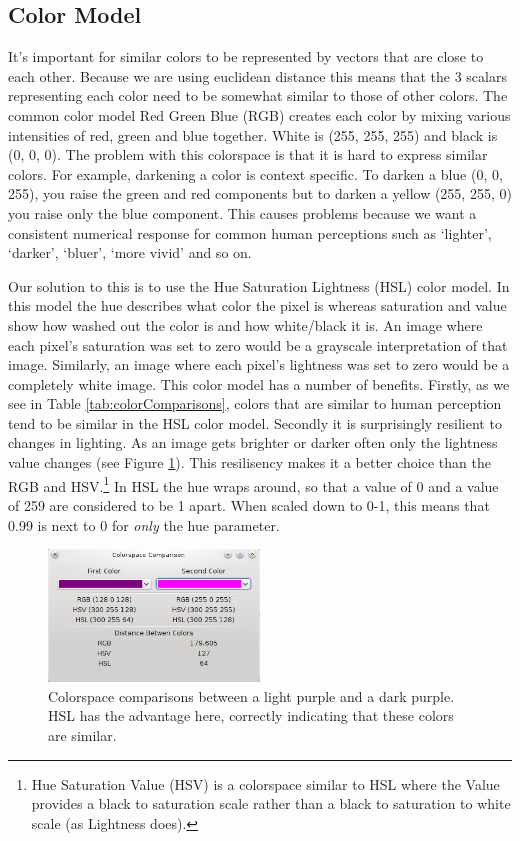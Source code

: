 \documentclass{article}
\renewcommand{\|}{\origbar} %
\begin{document}
\subsection{Color Model}
\label{sec:colorModel}

It's important for similar colors to be represented by vectors that are close to each other. Because we are using euclidean distance this means that the 3 scalars representing each color need to be somewhat similar to those of other colors. The common color model Red Green Blue (RGB) creates each color by mixing various intensities of red, green and blue together. White is (255, 255, 255) and black is (0, 0, 0). The problem with this colorspace is that it is hard to express similar colors. For example, darkening a color is context specific. To darken a blue (0, 0, 255), you raise the green and red components but to darken a yellow (255, 255, 0) you raise only the blue component. This causes problems because we want a consistent numerical response for common human perceptions such as `lighter', `darker', `bluer', `more vivid' and so on.

Our solution to this is to use the Hue Saturation Lightness (HSL) color model. In this model the hue describes what color the pixel is whereas saturation and value show how washed out the color is and how white/black it is. An image where each pixel's saturation was set to zero would be a grayscale interpretation of that image. Similarly, an image where each pixel's lightness was set to zero would be a completely white image. This color model has a number of benefits. Firstly, as we see in Table \ref{tab:colorComparisons}, colors that are similar to human perception tend to be similar in the HSL color model. Secondly it is surprisingly resilient to changes in lighting. As an image gets brighter or darker often only the lightness value changes (see Figure \ref{fig:colorspaceComparison}). This resilisency makes it a better choice than the RGB and HSV.\footnote{Hue Saturation Value (HSV) is a colorspace similar to HSL where the Value provides a black to saturation scale rather than a black to saturation to white scale (as Lightness does).} In HSL the hue wraps around, so that a value of 0 and a value of 259 are considered to be 1 apart. When scaled down to 0-1, this means that 0.99 is next to 0 for {\em only} the hue parameter.

\begin{figure}[h!]
  \begin{center}
    \includegraphics[width=0.5\textwidth]{colorspace_comparison_application.png}
  \end{center}
  \caption{Colorspace comparisons between a light purple and a dark purple. HSL has the advantage here, correctly indicating that these colors are similar.}
  \label{fig:colorspaceComparison}
\end{figure}
\end{document}
